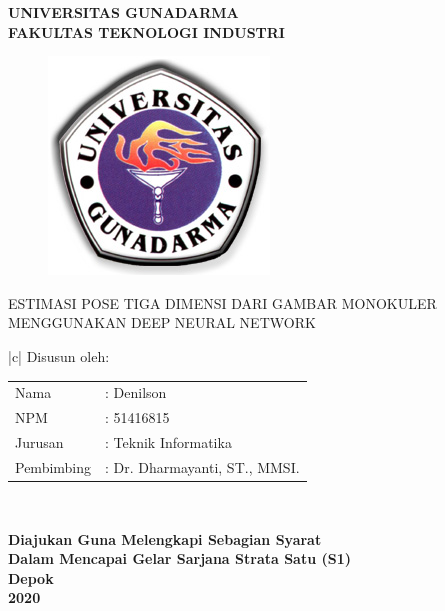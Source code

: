 \newpage


\begin{center}
\bfseries
{\large UNIVERSITAS GUNADARMA}\\
{\large FAKULTAS TEKNOLOGI INDUSTRI}\\

\vspace{1.5cm}

\begin{figure}[h]
  \begin{center}
    \includegraphics[scale=4.5]{gambar/LogoGunadarma.jpg}
  \end{center}
\end{figure}

\vspace{1.0cm}

{\large ESTIMASI POSE TIGA DIMENSI DARI GAMBAR MONOKULER MENGGUNAKAN DEEP NEURAL NETWORK}

\vspace{2.0cm}

\begin{tabular}{|c|}
  \hline
  Disusun oleh: \\
  \begin{tabular}{ll}
  Nama& : Denilson \\[-5pt]
  NPM& : 51416815 \\[-5pt]
  Jurusan& : Teknik Informatika \\[-5pt]
  Pembimbing& : Dr. Dharmayanti, ST., MMSI.\\
  \end{tabular}\\
  \hline
\end{tabular}

\end{center}

\vspace{1.5cm}

\begin{center}
\bfseries
Diajukan Guna Melengkapi Sebagian Syarat \\
Dalam Mencapai Gelar Sarjana Strata Satu (S1)\\

Depok\\
2020 %
\end{center}
